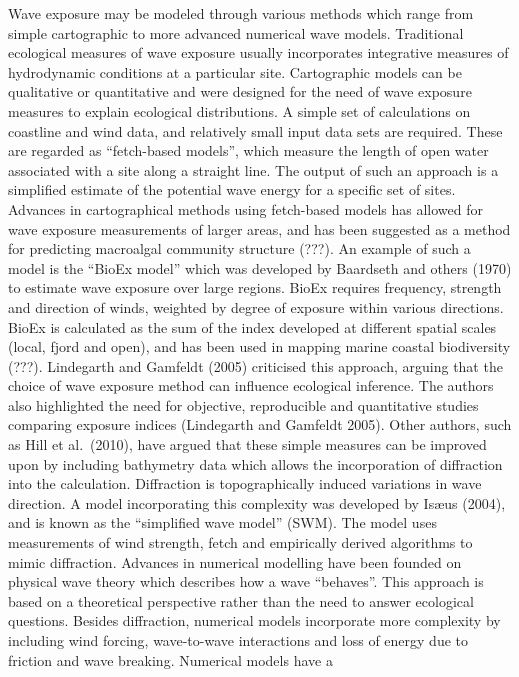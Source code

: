 \documentclass[
]{article}
\begin{document}
Wave exposure may be modeled through various methods which range from
simple cartographic to more advanced numerical wave models. Traditional
ecological measures of wave exposure usually incorporates integrative
measures of hydrodynamic conditions at a particular site. Cartographic
models can be qualitative or quantitative and were designed for the need
of wave exposure measures to explain ecological distributions. A simple
set of calculations on coastline and wind data, and relatively small
input data sets are required. These are regarded as ``fetch-based
models'', which measure the length of open water associated with a site
along a straight line. The output of such an approach is a simplified
estimate of the potential wave energy for a specific set of sites.
Advances in cartographical methods using fetch-based models has allowed
for wave exposure measurements of larger areas, and has been suggested
as a method for predicting macroalgal community structure (???). An
example of such a model is the ``BioEx model'' which was developed by
Baardseth and others (1970) to estimate wave exposure over large
regions. BioEx requires frequency, strength and direction of winds,
weighted by degree of exposure within various directions. BioEx is
calculated as the sum of the index developed at different spatial scales
(local, fjord and open), and has been used in mapping marine coastal
biodiversity (???). Lindegarth and Gamfeldt (2005) criticised this
approach, arguing that the choice of wave exposure method can influence
ecological inference. The authors also highlighted the need for
objective, reproducible and quantitative studies comparing exposure
indices (Lindegarth and Gamfeldt 2005). Other authors, such as Hill et
al.~(2010), have argued that these simple measures can be improved upon
by including bathymetry data which allows the incorporation of
diffraction into the calculation. Diffraction is topographically induced
variations in wave direction. A model incorporating this complexity was
developed by Isæus (2004), and is known as the ``simplified wave model''
(SWM). The model uses measurements of wind strength, fetch and
empirically derived algorithms to mimic diffraction. Advances in
numerical modelling have been founded on physical wave theory which
describes how a wave ``behaves''. This approach is based on a
theoretical perspective rather than the need to answer ecological
questions. Besides diffraction, numerical models incorporate more
complexity by including wind forcing, wave-to-wave interactions and loss
of energy due to friction and wave breaking. Numerical models have a
\end{document}

